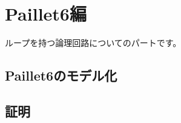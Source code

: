 \documentclass{jsbook}
\begin{document}
\chapter{Paillet6編}
ループを持つ論理回路についてのパートです。
\newpage
\section{Paillet6のモデル化}
\section{証明}
\end{document}

